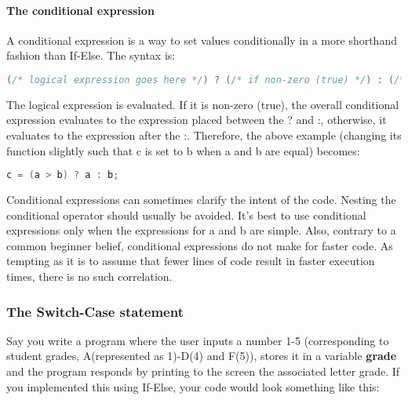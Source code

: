 \paragraph{The conditional expression}
A conditional expression is a way to set values conditionally in a more
shorthand fashion than If-Else. The syntax is:
\lstset{basicstyle=\scriptsize, numbers=left, captionpos=b, tabsize=4}
\begin{lstlisting}[caption=Section \thesection listing \arabic{controlcnt},language={C},
breaklines=true,xleftmargin=15pt, label=lst:section\thesection listing\arabic{controlcnt}]
(/* logical expression goes here */) ? (/* if non-zero (true) */) : (/* if 0 (false) */)
\end{lstlisting}

The logical expression is evaluated. If it is non-zero (true), the overall
conditional expression evaluates to the expression placed between the ? and :,
otherwise, it evaluates to the expression after the :. Therefore, the above
example (changing its function slightly such that c is set to b when a and b
are equal) becomes:

\lstset{basicstyle=\scriptsize, numbers=left, captionpos=b, tabsize=4}
\begin{lstlisting}[caption=Section \thesection listing \arabic{controlcnt},language={C},
breaklines=true,xleftmargin=15pt, label=lst:section\thesection listing\arabic{controlcnt}]
c = (a > b) ? a : b;
\end{lstlisting}

Conditional expressions can sometimes clarify the intent of the code. Nesting
the conditional operator should usually be avoided. It's best to use
conditional expressions only when the expressions for a and b are simple. Also,
contrary to a common beginner belief, conditional expressions do not make for
faster code. As tempting as it is to assume that fewer lines of code result in
faster execution times, there is no such correlation.

\subsubsection{The Switch-Case statement}
Say you write a program where the user inputs a number 1-5 (corresponding to
student grades, A(represented as 1)-D(4) and F(5)), stores it in a variable
\textbf{grade} and the program responds by printing to the screen the
associated letter grade. If you implemented this using If-Else, your code would
look something like this:


